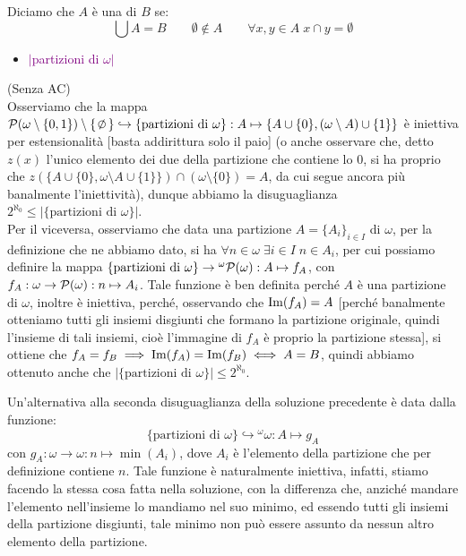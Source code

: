 \pagebreak
\begin{definition}[Partizione]
	Diciamo che $A$ \`e una  di $B$ se:
	\[ \bigcup A = B \qquad \emptyset \not\in A \qquad \forall x,y \in A \; x \cap y = \emptyset
		\]
\end{definition}

\begin{itemize}
	\item \textcolor{purple}{$|$partizioni di $\omega|$}
\end{itemize}

\begin{soln}
	(Senza AC)\\
	Osserviamo che la mappa $\ps(\omega\setminus\{0,1\})\setminus\{\emptyset\} \hookrightarrow \{\text{partizioni di $\omega$}\} : A \mapsto \{A\cup \{0\},(\omega\setminus A)\cup \{1\}\}$ \`e iniettiva per estensionalit\`a [basta addirittura solo il paio] (o anche osservare che, detto $z(x)$ l'unico elemento dei due della partizione che contiene lo 0, si ha proprio che $z(\{A\cup \{0\},\omega\setminus A\cup \{1\}\}) \cap (\omega\setminus\{0\}) = A$, da cui segue ancora pi\`u banalmente l'iniettivit\`a),
	dunque abbiamo la disuguaglianza $2^{\aleph_0} \leq |\{\text{partizioni di $\omega$}\}|$.\\
	Per il viceversa, osserviamo che data una partizione $A = \{A_i\}_{i \in I}$ di $\omega$, per la definizione che ne abbiamo dato, si ha $\forall n \in \omega \; \exists i \in I \; n \in A_i$, per cui possiamo definire la mappa $\{\text{partizioni di $\omega$}\} \rightarrow {}^{\omega}\mathcal{P}(\omega) : A \mapsto f_A$,
	con $f_A : \omega \rightarrow \mathcal{P}(\omega) : n \mapsto A_i$. Tale funzione \`e ben definita perch\'e $A$ \`e una partizione di $\omega$, inoltre \`e iniettiva, perch\'e, osservando che $\operatorname{Im}(f_A) = A$ [perch\'e banalmente otteniamo tutti gli insiemi disgiunti che formano la partizione originale, quindi l'insieme di tali insiemi, cio\`e l'immagine di $f_A$ \`e proprio la partizione stessa],
	si ottiene che $f_A = f_B \implies \operatorname{Im}(f_A) = \operatorname{Im}(f_B) \iff A = B$, quindi abbiamo ottenuto anche che $|\{\text{partizioni di $\omega$}\}| \leq 2^{\aleph_0}$.
\end{soln}

\begin{remark}
	Un'alternativa alla seconda disuguaglianza della soluzione precedente \`e data dalla funzione:
	\[ \{\text{partizioni di $\omega$}\} \hookrightarrow {}^\omega\omega : A \mapsto g_A
		\]
	con $g_A : \omega \to \omega : n \mapsto \min(A_i)$, dove $A_i$ \`e l'elemento della partizione che per definizione contiene $n$. Tale funzione \`e naturalmente iniettiva, infatti, stiamo facendo la stessa cosa fatta nella soluzione, con la differenza che, anzich\'e mandare l'elemento nell'insieme lo mandiamo nel suo minimo, ed essendo tutti gli insiemi della partizione disgiunti, tale minimo non pu\`o essere assunto da nessun altro elemento della partizione.
\end{remark}

